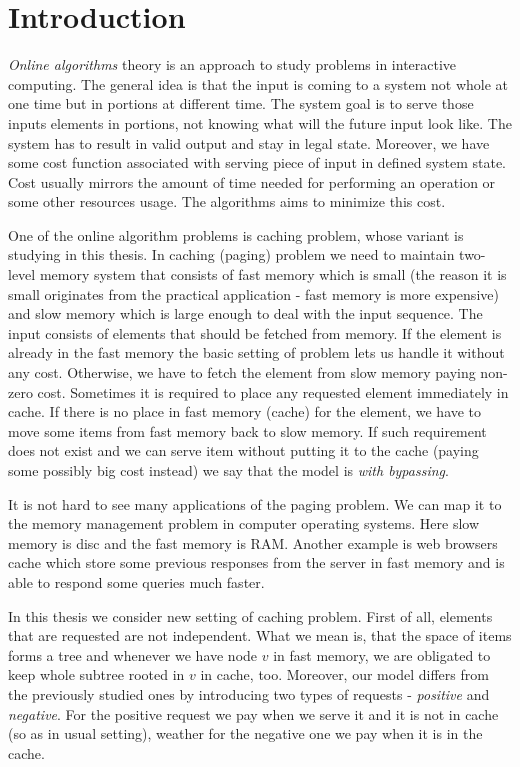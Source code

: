 \section{Introduction}
\textit{Online algorithms} theory is an approach to study problems in 
interactive computing. The general idea is that the input is coming to a 
system not  whole at one time but in portions at different time. The system 
goal is to serve those inputs elements in portions, not knowing what will the 
future input look like. The system has to result in valid output and stay in 
legal state. Moreover, we have some cost function associated with serving piece 
of input in defined system state. Cost usually mirrors the amount of time 
needed for performing an operation or some other resources usage. The 
algorithms aims to minimize this cost.

One of the online algorithm problems is caching problem, whose variant is 
studying in this thesis. In caching (paging) problem we need to maintain 
two-level memory system that consists of fast memory which is small (the reason 
it is small originates from the practical application - fast memory is more 
expensive) and slow memory which is large enough to deal with the input 
sequence. The input consists of elements that should be fetched from memory. If 
the element is already in the fast memory the basic setting of problem lets us 
handle it without any cost. Otherwise, we have to fetch the element from slow 
memory paying non-zero cost. Sometimes it is required to place any requested 
element immediately in cache. If there is no place in fast memory (cache) for 
the element, we have to move some items from fast memory back to slow memory. 
If such requirement does not exist and we can serve item without putting it to 
the cache (paying some possibly big cost instead) we say that the model is 
\textit{with bypassing}.

It is not hard to see many applications of the paging problem. We can map it to 
the memory management problem in computer operating systems. Here slow memory 
is disc and the fast memory is RAM. Another example is web browsers cache which 
store some previous responses from the server in fast memory and is able to 
respond some queries much faster.

In this thesis we consider new setting of caching problem. First of all, 
elements that are requested are not independent. What we mean is, that the 
space of items forms a tree and whenever we have node $v$ in fast memory, we 
are obligated to keep whole subtree rooted in $v$ in cache, too. Moreover, our 
model differs from the previously studied ones by introducing two types of 
requests - \textit{positive} and \textit{negative}. For the positive request we 
pay when we serve it and it is not in cache (so as in usual setting), weather 
for the negative one we pay when it is in the cache.

